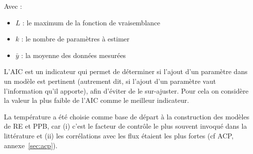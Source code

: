 Avec :
\begin{itemize}
\item $L$ : le maximum de la fonction de vraisemblance
\item $k$ : le nombre de paramètres à estimer
\item $\bar{y}$ : la moyenne des données mesurées
\end{itemize}

L'AIC est un indicateur qui permet de déterminer si l'ajout d'un paramètre dans un modèle est pertinent (autrement dit, si l'ajout d'un paramètre vaut l'information qu'il apporte), afin d'éviter de le sur-ajuster.
Pour cela on considère la valeur la plus faible de l'AIC comme le meilleur indicateur.


 


La température a été choisie comme base de départ à la construction des modèles de RE et PPB, car (i) c'est le facteur de contrôle le plus souvent invoqué dans la littérature et (ii) les corrélations avec les flux étaient les plus fortes (cf ACP, annexe~\ref{sec:acp}).

